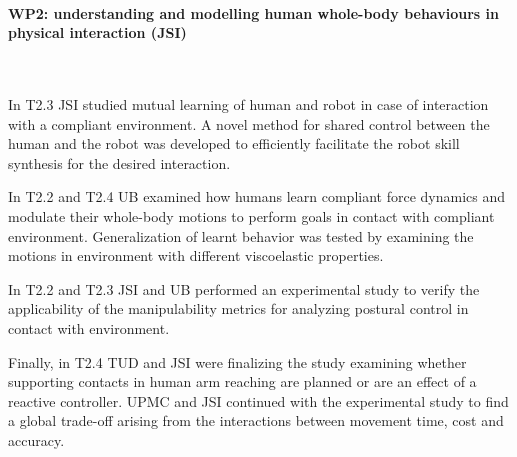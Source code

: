  
\paragraph*{WP2: understanding and modelling human whole-body behaviours in physical interaction (JSI)}
~\par
In T2.3 JSI studied mutual learning of human and robot in case of interaction with a compliant environment. A novel method for shared control between the human and the robot was developed to efficiently facilitate the robot skill synthesis for the desired interaction.

In T2.2 and T2.4 UB examined how humans learn compliant force dynamics and modulate their whole-body motions to perform goals in contact with compliant environment. Generalization of learnt behavior was tested by examining the motions in environment with different viscoelastic properties.

In T2.2 and T2.3 JSI and UB performed an experimental study to verify the applicability of the manipulability metrics for analyzing postural control in contact with environment.

Finally, in T2.4 TUD and JSI were finalizing the study examining whether supporting contacts in human arm reaching are planned or are an effect of a reactive controller. UPMC and JSI continued with the experimental study to find a global trade-off arising from the interactions between movement time, cost and accuracy.
